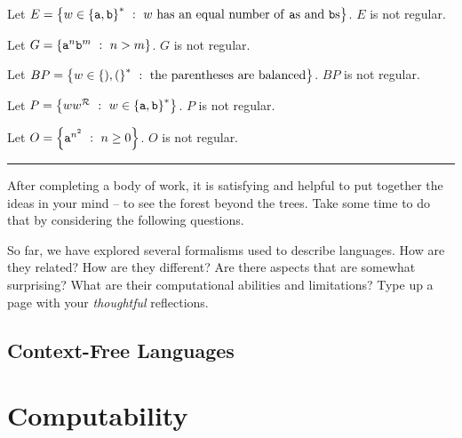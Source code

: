 \documentclass[twoside,letterpaper,openany]{book}
\begin{document}
\begin{thm}
Let $E = \left\lbrace w \in \left\lbrace {\texttt{a}}, {\texttt{b}} \right\rbrace^{*}\ :\ w~\textrm{has an equal number of {\texttt{a}}{s} and {\texttt{b}}{s}} \right\rbrace$. $E$ is not regular.
\end{thm}

\begin{thm}
Let $G = \left\lbrace {\texttt{a}}^n {\texttt{b}}^m\ :\ n > m \right\rbrace$. $G$ is not regular.
\end{thm}

\begin{thm}
Let $BP = \left\lbrace w \in \left\lbrace ), ( \right\rbrace^{*}\ :\ \textrm{the parentheses are balanced} \right\rbrace$. $BP$ is not regular.
\end{thm}


\begin{thm}
Let $P = \left\lbrace ww^{\mathcal{R}}\ :\ w \in \left\lbrace {\texttt{a}}, {\texttt{b}} \right\rbrace^{*} \right\rbrace$. $P$ is not regular.
\end{thm}

\begin{thm}
Let $O = \left\lbrace {\texttt{a}}^{n^2}\ :\ n \geq 0 \right\rbrace$. $O$ is not regular.
\end{thm}


\vspace{.3in}
\hrule 
\vspace{.3in}

\begin{discussion}
After completing a body of work, it is satisfying and helpful to put together the ideas in your mind -- to see the forest beyond the trees. Take some time to do that by considering the following questions.
\end{discussion}

\begin{exer}
So far, we have explored several formalisms used to describe languages. How are they related? How are they different? Are there aspects that are somewhat surprising? What are their computational abilities and limitations? Type up a page with your \emph{thoughtful} reflections.
\end{exer}



\chapter{Context-Free Languages}


\part{Computability}
\end{document}

